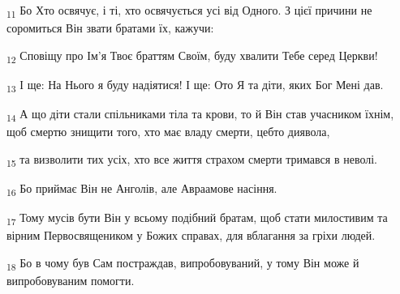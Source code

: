 \begin{tcolorbox}
\textsubscript{11} Бо Хто освячує, і ті, хто освячується усі від Одного. З цієї причини не соромиться Він звати братами їх, кажучи:
\end{tcolorbox}
\begin{tcolorbox}
\textsubscript{12} Сповіщу про Ім'я Твоє браттям Своїм, буду хвалити Тебе серед Церкви!
\end{tcolorbox}
\begin{tcolorbox}
\textsubscript{13} І ще: На Нього я буду надіятися! І ще: Ото Я та діти, яких Бог Мені дав.
\end{tcolorbox}
\begin{tcolorbox}
\textsubscript{14} А що діти стали спільниками тіла та крови, то й Він став учасником їхнім, щоб смертю знищити того, хто має владу смерти, цебто диявола,
\end{tcolorbox}
\begin{tcolorbox}
\textsubscript{15} та визволити тих усіх, хто все життя страхом смерти тримався в неволі.
\end{tcolorbox}
\begin{tcolorbox}
\textsubscript{16} Бо приймає Він не Анголів, але Авраамове насіння.
\end{tcolorbox}
\begin{tcolorbox}
\textsubscript{17} Тому мусів бути Він у всьому подібний братам, щоб стати милостивим та вірним Первосвящеником у Божих справах, для вблагання за гріхи людей.
\end{tcolorbox}
\begin{tcolorbox}
\textsubscript{18} Бо в чому був Сам постраждав, випробовуваний, у тому Він може й випробовуваним помогти.
\end{tcolorbox}
